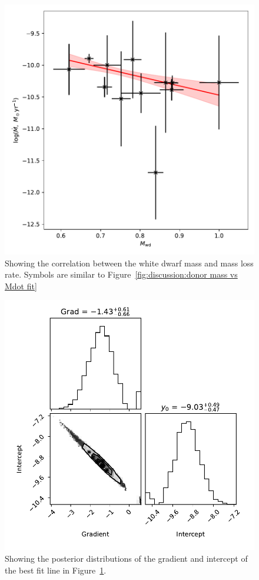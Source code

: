 \begin{figure}
    \centering
    \includegraphics[width=\textwidth]{figures/results/Mdot/Mwd_Mdot-chopped_MCMC_both-errs_fit.pdf}
    \caption{Showing the correlation between the white dwarf mass and mass loss rate. Symbols are similar to Figure~\ref{fig:discussion:donor mass vs Mdot fit}}
    \label{fig:discussion:white dwarf mass vs Mdot fit}
\end{figure}
\begin{figure}
    \centering
    \includegraphics[width=\textwidth]{figures/results/Mdot/Mwd_Mdot-chopped_MCMC_both-errs_corner.pdf}
    \caption{Showing the posterior distributions of the gradient and intercept of the best fit line in Figure~\ref{fig:discussion:white dwarf mass vs Mdot fit}.}
    \label{fig:discussion:white dwarf mass vs Mdot corner}
\end{figure}
